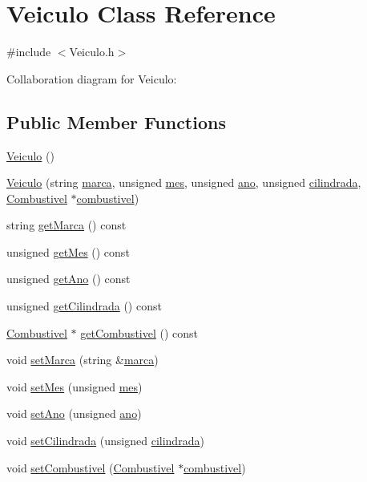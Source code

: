 \hypertarget{class_veiculo}{\section{Veiculo Class Reference}
\label{class_veiculo}
}


{\ttfamily \#include $<$Veiculo.\+h$>$}



Collaboration diagram for Veiculo\+:
\subsection*{Public Member Functions}
\begin{DoxyCompactItemize}
\item 
\hyperlink{class_veiculo_aafab27708a2639bc83a4c3721e57d196}{Veiculo} ()
\item 
\hyperlink{class_veiculo_a6c66e8e5759b1f8d21c292865d4a12bd}{Veiculo} (string \hyperlink{class_veiculo_ab20b89442a0ddaedd074bb0de75838c8}{marca}, unsigned \hyperlink{class_veiculo_ac4146f7b3d38e31e3225074e0fb0dea9}{mes}, unsigned \hyperlink{class_veiculo_ae141824a9353b3f7ed99d5c34c830fe2}{ano}, unsigned \hyperlink{class_veiculo_a3c3b3f2f958a98b48fa5e4f46007c9f9}{cilindrada}, \hyperlink{class_combustivel}{Combustivel} $\ast$\hyperlink{class_veiculo_ad8416cc9da449baed5e07ed146572712}{combustivel})
\item 
string \hyperlink{class_veiculo_a2a9d144f41694ea56a33f20a1c97f80b}{get\+Marca} () const 
\item 
unsigned \hyperlink{class_veiculo_a9cd8a208e3a1dbf1ba02281f1e97f99c}{get\+Mes} () const 
\item 
unsigned \hyperlink{class_veiculo_af86f9122ce46d301c58e6247c641ff7b}{get\+Ano} () const 
\item 
unsigned \hyperlink{class_veiculo_a03fe5c5380da49cdc25014bf90934263}{get\+Cilindrada} () const 
\item 
\hyperlink{class_combustivel}{Combustivel} $\ast$ \hyperlink{class_veiculo_a20bc51c40fba45b910ca01db48f192fb}{get\+Combustivel} () const 
\item 
void \hyperlink{class_veiculo_a4376b75295af584bea72db312e909d52}{set\+Marca} (string \&\hyperlink{class_veiculo_ab20b89442a0ddaedd074bb0de75838c8}{marca})
\item 
void \hyperlink{class_veiculo_abce426bdb78d81f59e4bd3de01b05fea}{set\+Mes} (unsigned \hyperlink{class_veiculo_ac4146f7b3d38e31e3225074e0fb0dea9}{mes})
\item 
void \hyperlink{class_veiculo_ad71370069a5a0f587fced2c49028cdfa}{set\+Ano} (unsigned \hyperlink{class_veiculo_ae141824a9353b3f7ed99d5c34c830fe2}{ano})
\item 
void \hyperlink{class_veiculo_ad41e09a8864fc77143c30218c2441f77}{set\+Cilindrada} (unsigned \hyperlink{class_veiculo_a3c3b3f2f958a98b48fa5e4f46007c9f9}{cilindrada})
\item 
void \hyperlink{class_veiculo_a885e49550f411dc99fa09ba226476679}{set\+Combustivel} (\hyperlink{class_combustivel}{Combustivel} $\ast$\hyperlink{class_veiculo_ad8416cc9da449baed5e07ed146572712}{combustivel})
\end{DoxyCompactItemize}
